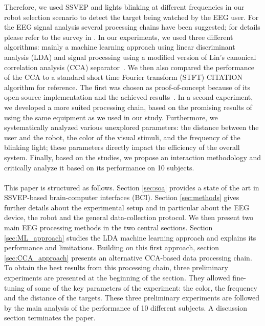 \documentclass[smallextended]{svjour3}
\begin{document}
Therefore, we used SSVEP and lights blinking at different frequencies in our robot selection scenario to detect the target being watched by the EEG user. 
For the EEG signal analysis several processing chains have been suggested; for details please refer to the survey in \cite{Bi2013}. In our experiments, we used three different algorithms: mainly a machine learning approach using linear discriminant analysis (LDA) and signal processing using a modified version of Lin's canonical correlation analysis (CCA) separator~\cite{Lin2014}.
We then also compared the performance of the CCA to a standard short time Fourier transform (STFT) CITATION algorithm for reference.
The first was chosen as proof-of-concept because of its open-source implementation and the achieved results~\cite{openvibeSSVEP}. In a second experiment, we developed a more suited processing chain, based on the promising results of~\cite{Lin2014} using the same equipment as we used in our study.
Furthermore, we systematically analyzed various unexplored parameters: the distance between the user and the robot, the color of the visual stimuli, and the frequency of the blinking light; these parameters directly impact the efficiency of the overall system. 
Finally, based on the studies, we propose an interaction methodology and critically analyze it based on its performance on 10 subjects.\\
\\
This paper is structured as follows. Section \ref{sec:soa} provides a state of the art in SSVEP-based brain-computer interfaces (BCI). Section \ref{sec:methods} gives further details about the experimental setup and in particular about the EEG device, the robot and the general data-collection protocol. 
We then present two main EEG processing methods in the two central sections. Section \ref{sec:ML_approach} studies the LDA machine learning approach and explains its performance and limitations. Building on this first approach, section \ref{sec:CCA_approach} presents an alternative CCA-based data processing chain.
To obtain the best results from this processing chain, three preliminary experiments are presented at the beginning of the section.
They allowed fine-tuning of some of the key parameters of the experiment: the color, the frequency and the distance of the targets. These three preliminary experiments are followed by the main analysis of the performance of 10 different subjects. A discussion section terminates the paper.
\end{document}
